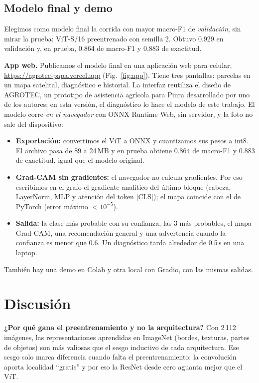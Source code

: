 \documentclass[conference,a4paper]{IEEEtran}
\begin{document}
\subsection{Modelo final y demo}
Elegimos como modelo final la corrida con mayor macro-F1 de \emph{validación}, sin mirar la prueba: ViT-S/16 preentrenado con semilla 2. Obtuvo 0.929 en validación y, en prueba, 0.864 de macro-F1 y 0.883 de exactitud.

\textbf{App web.} Publicamos el modelo final en una aplicación web para celular, \url{https://agrotec-papa.vercel.app} (Fig.~\ref{fig:app}). Tiene tres pantallas: parcelas en un mapa satelital, diagnóstico e historial. La interfaz reutiliza el diseño de AGROTEC, un prototipo de asistencia agrícola para Piura desarrollado por uno de los autores; en esta versión, el diagnóstico lo hace el modelo de este trabajo. El modelo corre \emph{en el navegador} con ONNX Runtime Web, sin servidor, y la foto no sale del dispositivo:
\begin{itemize}
\item \textbf{Exportación:} convertimos el ViT a ONNX y cuantizamos sus pesos a int8. El archivo pasa de 89 a 24\,MB y en prueba obtiene 0.864 de macro-F1 y 0.883 de exactitud, igual que el modelo original.
\item \textbf{Grad-CAM sin gradientes:} el navegador no calcula gradientes. Por eso escribimos en el grafo el gradiente analítico del último bloque (cabeza, LayerNorm, MLP y atención del token [CLS]); el mapa coincide con el de PyTorch (error máximo $<10^{-5}$).
\item \textbf{Salida:} la clase más probable con su confianza, las 3 más probables, el mapa Grad-CAM, una recomendación general y una advertencia cuando la confianza es menor que 0.6. Un diagnóstico tarda alrededor de 0.5\,s en una laptop.
\end{itemize}
También hay una demo en Colab y otra local con Gradio, con las mismas salidas.

\section{Discusión}\label{sec:discussion}
\textbf{¿Por qué gana el preentrenamiento y no la arquitectura?} Con 2\,112 imágenes, las representaciones aprendidas en ImageNet (bordes, texturas, partes de objetos) son más valiosas que el sesgo inductivo de cada arquitectura. Ese sesgo solo marca diferencia cuando falta el preentrenamiento: la convolución aporta localidad ``gratis'' y por eso la ResNet desde cero aguanta mejor que el ViT.
\end{document}
